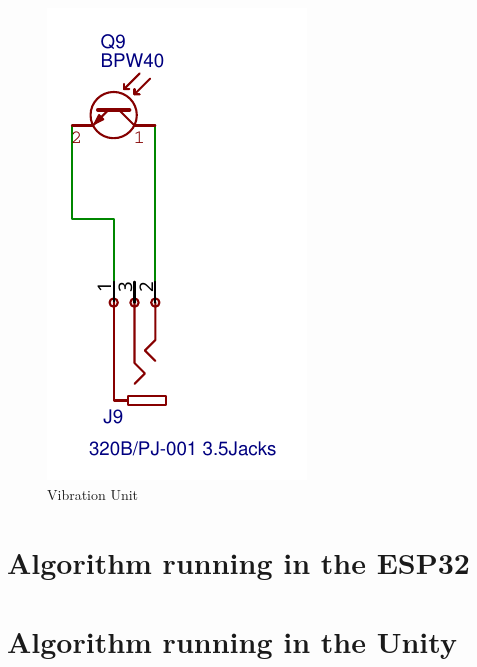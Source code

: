     \begin{figure}[htbp]
        \centering
        \hspace{1cm}
        \includegraphics[width=.45\textwidth]{Apend Cinto/Unidade Vibracao.pdf}
        \caption{Vibration Unit}
        \label{vibration_unit}
    \end{figure}
    
\pagebreak
    
\section{Algorithm running in the ESP32}


\section{Algorithm running in the Unity}

